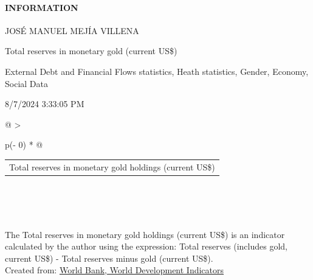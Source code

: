 \documentclass[
]{article}
\providecommand{\tightlist}{%
  \setlength{\itemsep}{0pt}\setlength{\parskip}{0pt}}
\newenvironment{LTR}{\beginL}{\endL}
\begin{document}
\begin{itemize}
  \hypertarget{infoLinkDesc}{}
  \hypertarget{information}{%
  \paragraph{\texorpdfstring{INFORMATION
  {}}{INFORMATION }}\label{information}}

  \hypertarget{reportDescription}{}
  \begin{description}
  \tightlist
  \item[Created by]
  JOSÉ MANUEL MEJÍA VILLENA
  \item[Description]
  Total reserves in monetary gold (current US\$)
  \item[Tags]
  External Debt and Financial Flows statistics, Heath statistics,
  Gender, Economy, Social Data
  \item[Last Updated]
  8/7/2024 3:33:05 PM
  \end{description}
\end{itemize}

\protect\hypertarget{fullScreen}{\href{javascript:void(0)}{}}

\begin{longtable}[]{@{}
  >{\raggedright\arraybackslash}p{(\columnwidth - 0\tabcolsep) * }@{}}
\toprule\noalign{}
\endhead
\bottomrule\noalign{}
\endlastfoot
\begin{minipage}[t]{\linewidth}\raggedright
\hypertarget{REPORT_PREVIEW_divdropdown}{}
\begin{longtable}[]{@{}l@{}}
\toprule\noalign{}
\endhead
\bottomrule\noalign{}
\endlastfoot
Total reserves in monetary gold holdings (current US\$)
\protect\hypertarget{REPORT_PREVIEW_meta_link_page_WDI_Series}{}{{{}}} \\
\end{longtable}
\end{minipage} \\
 \\
\begin{minipage}[t]{\linewidth}\raggedright
\hypertarget{container}{}
\begin{LTR}
\end{LTR}
\end{minipage} \\
\protect\hypertarget{REPORT_PREVIEW_lblXAxis}{}{}
\protect\hypertarget{REPORT_PREVIEW_lblFooter}{}{The Total reserves in
monetary gold holdings (current US\$) is an indicator calculated by the
author using the expression: Total reserves (includes gold, current
US\$) - Total reserves minus gold (current US\$).} \\
\protect\hypertarget{REPORT_PREVIEW_sReportSource}{}{Created from:}
\protect\hypertarget{REPORT_PREVIEW_hplDatabaseName}{\href{javascript:Shared(\textquotesingle{}/Total-reserves-in-monetary-gold-holdings-(current-US$)---Graph/id/c95a71e2\textquotesingle{});}{World
Bank, World Development Indicators}} \\
\textbf{} \protect\hypertarget{REPORT_PREVIEW_sDisclaimerMsg}{}{ } \\
\end{longtable}
\end{document}

